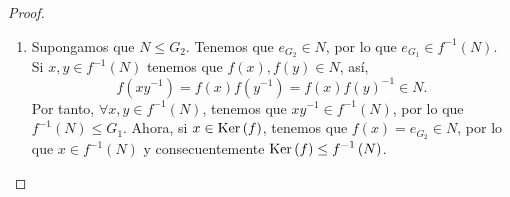 \begin{proof}
\begin{enumerate}
\item Supongamos que $\displaystyle N \leq G_{2} $. Tenemos que $\displaystyle e_{G_{2}} \in N $, por lo que $\displaystyle e_{G_{1}} \in f^{-1}\left(N\right) $. Si $\displaystyle x,y \in f^{-1}\left(N\right) $ tenemos que $\displaystyle f\left(x\right), f\left(y\right) \in N $, así, 
	\[f\left(xy^{-1}\right)= f\left(x\right)f\left(y^{-1}\right) = f\left(x\right) f\left(y\right)^{-1} \in N .\]
	Por tanto, $\displaystyle \forall x,y \in f^{-1}\left(N\right) $, tenemos que $\displaystyle xy^{-1} \in f^{-1}\left(N\right) $, por lo que $\displaystyle f^{-1}\left(N\right) \leq G_{1} $. Ahora, si $\displaystyle x \in \operatorname{Ker}\left(f\right) $, tenemos que $\displaystyle f\left(x\right) = e_{G_{2}} \in N $, por lo que $\displaystyle x \in f^{-1}\left(N\right) $ y consecuentemente $\displaystyle \operatorname{Ker}\left(f\right) \leq f^{-1}\left(N\right) $.
\end{enumerate}
\end{proof}

